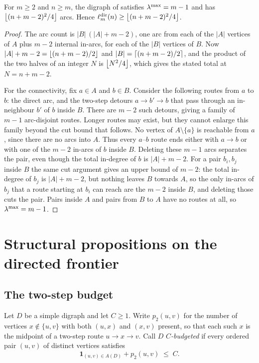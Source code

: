 \begin{lemma}\label{lem:augmented-feasible}
For $m \ge 2$ and $n \ge m$, the digraph of  satisfies $\lambda^{\max} = m-1$ and has $\left\lfloor (n+m-2)^2/4 \right\rfloor$ arcs. Hence $\ell_m^{\mathrm{dir}}(n) \ge \left\lfloor (n+m-2)^2/4 \right\rfloor$.
\end{lemma}

\begin{proof}
The arc count is $|B|\,(|A| + m - 2)$, one arc from each of the $|A|$ vertices of $A$ plus $m-2$ internal in-arcs, for each of the $|B|$ vertices of $B$. Now $|A| + m - 2 = \left\lfloor (n+m-2)/2 \right\rfloor$ and $|B| = \left\lceil (n+m-2)/2 \right\rceil$, and the product of the two halves of an integer $N$ is $\left\lfloor N^2/4 \right\rfloor$, which gives the stated total at $N = n+m-2$.

For the connectivity, fix $a \in A$ and $b \in B$. Consider the following routes from $a$ to $b$: the direct arc, and the two-step detours $a \to b' \to b$ that pass through an in-neighbour $b'$ of $b$ inside $B$. There are $m - 2$ such detours, giving a family of $m - 1$ arc-disjoint routes. Longer routes may exist, but they cannot enlarge this family beyond the cut bound that follows. No vertex of $A\setminus\{a\}$ is reachable from $a$, since there are no arcs into $A$. Thus every $a$--$b$ route ends either with $a\to b$ or with one of the $m-2$ in-arcs of $b$ inside $B$. Deleting these $m-1$ arcs separates the pair, even though the total in-degree of $b$ is $|A|+m-2$. For a pair $b_i, b_j$ inside $B$ the same cut argument gives an upper bound of $m-2$: the total in-degree of $b_j$ is $|A| + m - 2$, but nothing leaves $B$ towards $A$, so the only in-arcs of $b_j$ that a route starting at $b_i$ can reach are the $m-2$ inside $B$, and deleting those cuts the pair. Pairs inside $A$ and pairs from $B$ to $A$ have no routes at all, so $\lambda^{\max} = m - 1$.
\end{proof}

\section{Structural propositions on the directed frontier}

\subsection{The two-step budget}\label{sec:two-step-budget}

\begin{definition}\label{def:two-step-budget}
Let $D$ be a simple digraph and let $C \ge 1$. Write $p_2(u,v)$ for the number of vertices $x \notin \{u,v\}$ with both $(u,x)$ and $(x,v)$ present, so that each such $x$ is the midpoint of a two-step route $u \to x \to v$. Call $D$ \emph{$C$-budgeted} if every ordered pair $(u,v)$ of distinct vertices satisfies
\[
    \mathbf{1}_{(u,v) \in A(D)} + p_2(u,v) \;\le\; C .
\]
\end{definition}

